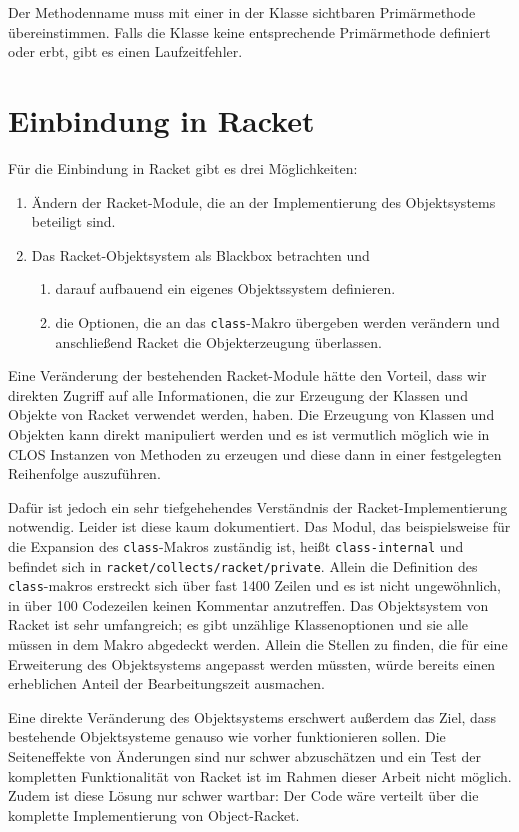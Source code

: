 Der Methodenname muss mit einer in der Klasse sichtbaren Primärmethode übereinstimmen. Falls die Klasse keine entsprechende Primärmethode definiert oder erbt, gibt es einen Laufzeitfehler.

\section{Einbindung in Racket}
Für die Einbindung in Racket gibt es drei Möglichkeiten:
\begin{enumerate}
 \item Ändern der Racket-Module, die an der Implementierung des Objektsystems beteiligt sind.
 \item Das Racket-Objektsystem als Blackbox betrachten und 
 \begin{enumerate}
  \item darauf aufbauend ein eigenes Objektssystem definieren.
  \item die Optionen, die an das \texttt{class}-Makro übergeben werden verändern und anschließend Racket die Objekterzeugung überlassen.
 \end{enumerate}
\end{enumerate}

Eine Veränderung der bestehenden Racket-Module hätte den Vorteil, dass wir direkten Zugriff auf alle Informationen, die zur Erzeugung der Klassen und Objekte von Racket verwendet werden, haben. Die Erzeugung von Klassen und Objekten kann direkt manipuliert werden und es ist vermutlich möglich wie in CLOS Instanzen von Methoden zu erzeugen und diese dann in einer festgelegten Reihenfolge auszuführen. 

Dafür ist jedoch ein sehr tiefgehehendes Verständnis der Racket-Implementierung notwendig. Leider ist diese kaum dokumentiert. Das Modul, das beispielsweise für die Expansion des \texttt{class}-Makros zuständig ist, heißt \texttt{class-internal} und befindet sich in \texttt{racket/collects/racket/private}. Allein die Definition des \texttt{class}-makros erstreckt sich über fast 1400 Zeilen und es ist nicht ungewöhnlich, in über 100 Codezeilen keinen Kommentar anzutreffen. Das Objektsystem von Racket ist sehr umfangreich; es gibt unzählige Klassenoptionen und sie alle müssen in dem Makro abgedeckt werden. Allein die Stellen zu finden, die für eine Erweiterung des Objektsystems angepasst werden müssten, würde bereits einen erheblichen Anteil der Bearbeitungszeit ausmachen.

Eine direkte Veränderung des Objektsystems erschwert außerdem das Ziel, dass bestehende Objektsysteme genauso wie vorher funktionieren sollen. Die Seiteneffekte von Änderungen sind nur schwer abzuschätzen und ein Test der kompletten Funktionalität von Racket ist im Rahmen dieser Arbeit nicht möglich. Zudem ist diese Lösung nur schwer wartbar: Der Code wäre verteilt über die komplette Implementierung von Object-Racket. 

